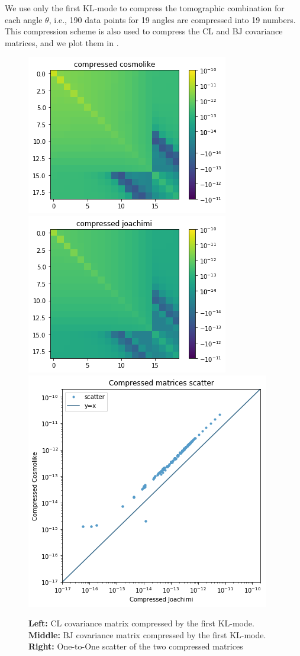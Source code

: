 \documentclass[twocolumn]{\docclass}
\begin{document}
	We use only the first KL-mode to compress the tomographic combination for each angle $\theta$, i.e., 190 data points for 19 angles are compressed into 19 numbers.  This compression scheme is also used to compress the CL and BJ covariance matrices, and we plot them in .
	
	\begin{figure}
		\includegraphics[width=0.68\columnwidth]{kl_comp_cl.png}
		\includegraphics[width=0.68\columnwidth]{kl_comp_bj.png}
		\includegraphics[width=0.54\columnwidth]{kl_scatter.png}
		\caption{\textbf{Left:} CL covariance matrix compressed by the first KL-mode. \textbf{Middle:} BJ covariance matrix compressed by the first KL-mode. \textbf{Right:} One-to-One scatter of the two compressed matrices \label{fig:comp-cov}}
	\end{figure}
	
\end{document}
